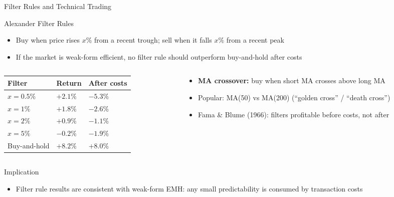 \documentclass[9pt, aspectratio=169, t]{beamer}
\theoremstyle{definition}
\newenvironment{cminipage}[1]{%
    \par\noindent\hfill\begin{minipage}{#1}\ignorespaces
}{%
    \end{minipage}\hfill\null\par
}
\begin{document}
\begin{frame}{Filter Rules and Technical Trading}
\begin{cminipage}{0.95\textwidth}
\footnotesize
\begin{block}{Alexander Filter Rules}
\begin{itemize}\setlength{\itemsep}{0pt}
    \item Buy when price rises $x\%$ from a recent trough; sell when it falls $x\%$ from a recent peak
    \item If the market is weak-form efficient, no filter rule should outperform buy-and-hold after costs
\end{itemize}
\end{block}

\vspace{-1mm}
\begin{columns}[T]
\begin{column}{0.48\textwidth}
\scriptsize
\renewcommand{\arraystretch}{1.0}
\begin{tabular}{lll}
\toprule
\textbf{Filter} & \textbf{Return} & \textbf{After costs} \\
\midrule
$x = 0.5\%$ & $+2.1\%$ & $-5.3\%$ \\
$x = 1\%$ & $+1.8\%$ & $-2.6\%$ \\
$x = 2\%$ & $+0.9\%$ & $-1.1\%$ \\
$x = 5\%$ & $-0.2\%$ & $-1.9\%$ \\
Buy-and-hold & $+8.2\%$ & $+8.0\%$ \\
\bottomrule
\end{tabular}
\end{column}
\begin{column}{0.48\textwidth}
\begin{itemize}\setlength{\itemsep}{0pt}
    \item \textbf{MA crossover:} buy when short MA crosses above long MA
    \item Popular: MA(50) vs MA(200) (``golden cross'' / ``death cross'')
    \item Fama \& Blume (1966): filters profitable before costs, not after
\end{itemize}
\end{column}
\end{columns}

\vspace{-1mm}
\begin{exampleblock}{Implication}
\begin{itemize}\setlength{\itemsep}{0pt}
    \item Filter rule results are consistent with weak-form EMH: any small predictability is consumed by transaction costs
\end{itemize}
\end{exampleblock}
\end{cminipage}
\end{frame}
\end{document}
